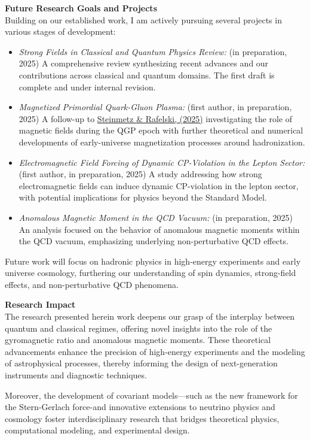 \documentclass[11pt]{article}
\begin{document}
{\large\textbf{Future Research Goals and Projects}}\\
Building on our established work, I am actively pursuing several projects in various stages of development:
\begin{itemize}[leftmargin=1.5em,nosep]
    \item \emph{Strong Fields in Classical and Quantum Physics Review:} (in preparation, 2025) A comprehensive review synthesizing recent advances and our contributions across classical and quantum domains. The first draft is complete and under internal revision.
    \item \emph{Magnetized Primordial Quark-Gluon Plasma:} (first author, in preparation, 2025) A follow-up to \href{https://doi.org/10.48550/arXiv.2502.05052}{Steinmetz \& Rafelski, (2025)} investigating the role of magnetic fields during the QGP epoch with further theoretical and numerical developments of early-universe magnetization processes around hadronization.
    \item \emph{Electromagnetic Field Forcing of Dynamic CP-Violation in the Lepton Sector:} (first author, in preparation, 2025) A study addressing how strong electromagnetic fields can induce dynamic CP-violation in the lepton sector, with potential implications for physics beyond the Standard Model.
    \item \emph{Anomalous Magnetic Moment in the QCD Vacuum:} (in preparation, 2025) An analysis focused on the behavior of anomalous magnetic moments within the QCD vacuum, emphasizing underlying non-perturbative QCD effects.
\end{itemize}
Future work will focus on hadronic physics in high-energy experiments and early universe cosmology, furthering our understanding of spin dynamics, strong-field effects, and non-perturbative QCD phenomena.

{\large\textbf{Research Impact}}\\
The research presented herein work deepens our grasp of the interplay between quantum and classical regimes, offering novel insights into the role of the gyromagnetic ratio and anomalous magnetic moments. These theoretical advancements enhance the precision of high-energy experiments and the modeling of astrophysical processes, thereby informing the design of next-generation instruments and diagnostic techniques.

Moreover, the development of covariant models—such as the new framework for the Stern-Gerlach force-and innovative extensions to neutrino physics and cosmology foster interdisciplinary research that bridges theoretical physics, computational modeling, and experimental design.
\end{document}
